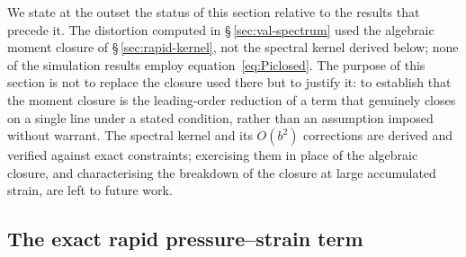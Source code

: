 \documentclass[lineno]{JFM-FLM_Au}
\newcounter{assumption}
\begin{document}
We state at the outset the status of this section relative to the results that
precede it. The distortion computed in \S\,\ref{sec:val-spectrum} used the
algebraic moment closure of \S\,\ref{sec:rapid-kernel}, not the spectral kernel
derived below; none of the simulation results employ equation~\eqref{eq:Piclosed}.
The purpose of this section is not to replace the closure used there but to
justify it: to establish that the moment closure is the leading-order reduction
of a term that genuinely closes on a single line under a stated condition, rather
than an assumption imposed without warrant. The spectral kernel and its $O(b^2)$
corrections are derived and verified against exact constraints; exercising them
in place of the algebraic closure, and characterising the breakdown of the
closure at large accumulated strain, are left to future work.

\subsection{The exact rapid pressure--strain term}\label{sec:exact-pi}
\end{document}
